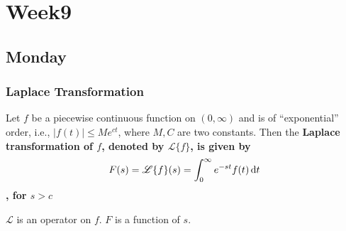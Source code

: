 \chapter{Week9}

\section{Monday}
\subsection{Laplace Transformation}
\begin{definition}
Let $f$ be a piecewise continuous function on $(0,\infty)$ and is of ``exponential'' order, i.e., $|f(t)|\leq Me^{ct}$, where $M, C$ are two constants. Then the \bf{Laplace transformation} of $f$, denoted by $\mathscr{L}\{f\}$, is given by 
\[F(s)=\mathscr{L}\{f\}(s)=\int_0^\infty e^{-st}f(t)\,\mathrm{d} t
\]
, for $s>c$


\end{definition}
\begin{remark}
$\mathscr{L}$ is an operator on $f$. $F$ is a function of $s$.
\end{remark}

